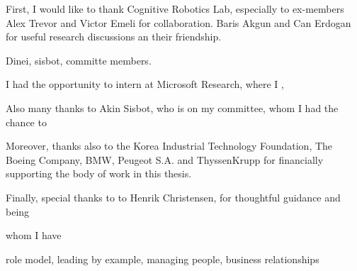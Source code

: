 \begin{acknowledgements}

First, I would like to thank Cognitive Robotics Lab, especially to ex-members Alex Trevor and Victor Emeli for collaboration. Baris Akgun and Can Erdogan for useful research discussions an their friendship.




 Dinei, sisbot, committe members.

I had the opportunity to intern at Microsoft Research, where I ,

Also many thanks to Akin Sisbot,  who is on my committee, whom I had the chance to 

Moreover, thanks also to the Korea Industrial Technology Foundation, The Boeing Company, BMW, Peugeot S.A. and ThyssenKrupp for financially supporting the body of work in this thesis. 


Finally, special thanks to to Henrik Christensen, for thoughtful guidance and being

whom I have 

role model, leading by example, managing people, business relationships




\end{acknowledgements}